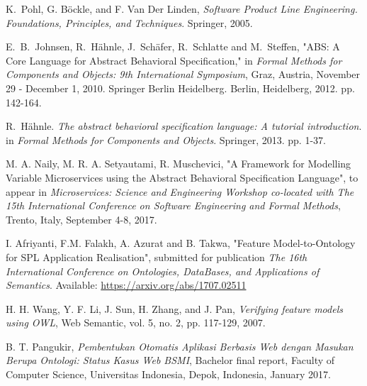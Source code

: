 \documentclass[conference]{IEEEtran}
\begin{document}
%
%
%
\begin{thebibliography}{1}


K.~Pohl, G. B\"{o}ckle, and F. Van Der Linden, \textit{Software Product Line Engineering. Foundations, Principles, and Techniques}. Springer, 2005.

E.~B.~Johnsen, R.~H\"{a}hnle, J.~Sch\"{a}fer, R.~Schlatte and M.~Steffen, "ABS: A Core Language for Abstract Behavioral Specification," in \textit{Formal Methods for Components and Objects: 9th International Symposium}, Graz, Austria, November 29 - December 1, 2010. Springer Berlin Heidelberg. Berlin, Heidelberg, 2012. pp. 142-164.

R.~H\"{a}hnle. \textit{The abstract behavioral specification language: A tutorial introduction}.
in \textit{Formal Methods for Components and Objects}. Springer, 2013. pp. 1-37.

M. A. Naily, M. R. A. Setyautami, R. Muschevici, "A Framework for Modelling Variable Microservices using the Abstract Behavioral Specification Language", to appear in \textit{Microservices: Science and Engineering Workshop co-located with The 15th International Conference on Software Engineering and Formal Methods}, Trento, Italy, September 4-8, 2017. 

I. Afriyanti, F.M. Falakh, A. Azurat and B. Takwa, "Feature Model-to-Ontology for SPL Application Realisation", submitted for publication \textit{The 16th International Conference on Ontologies, DataBases, and Applications of Semantics}. Available: \url{https://arxiv.org/abs/1707.02511}

H. H. Wang, Y. F. Li, J. Sun, H. Zhang, and J. Pan, \textit{Verifying feature models using OWL}, Web Semantic, vol. 5, no. 2, pp. 117-129, 2007.


B. T. Pangukir, \textit{Pembentukan Otomatis Aplikasi Berbasis Web dengan Masukan Berupa Ontologi: Status Kasus Web BSMI}, Bachelor final report, Faculty of Computer Science, Universitas Indonesia, Depok, Indonesia, January 2017.


\end{thebibliography}

\end{document}
